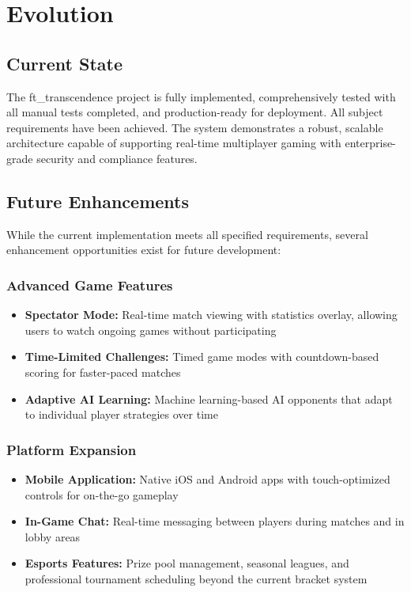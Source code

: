 \documentclass[11pt,a4paper]{report}
\begin{document}
\chapter{Evolution}
\label{ch:evolution}

\section{Current State}
\label{sec:current_state}

The ft\_transcendence project is fully implemented, comprehensively tested with all manual tests completed, and production-ready for deployment. All subject requirements have been achieved. The system demonstrates a robust, scalable architecture capable of supporting real-time multiplayer gaming with enterprise-grade security and compliance features.

\section{Future Enhancements}
\label{sec:future_enhancements}

While the current implementation meets all specified requirements, several enhancement opportunities exist for future development:

\subsection{Advanced Game Features}
\begin{itemize}
  \item \textbf{Spectator Mode:} Real-time match viewing with statistics overlay, allowing users to watch ongoing games without participating
  \item \textbf{Time-Limited Challenges:} Timed game modes with countdown-based scoring for faster-paced matches
  \item \textbf{Adaptive AI Learning:} Machine learning-based AI opponents that adapt to individual player strategies over time
\end{itemize}

\subsection{Platform Expansion}
\begin{itemize}
  \item \textbf{Mobile Application:} Native iOS and Android apps with touch-optimized controls for on-the-go gameplay
  \item \textbf{In-Game Chat:} Real-time messaging between players during matches and in lobby areas
  \item \textbf{Esports Features:} Prize pool management, seasonal leagues, and professional tournament scheduling beyond the current bracket system
\end{itemize}
\end{document}
